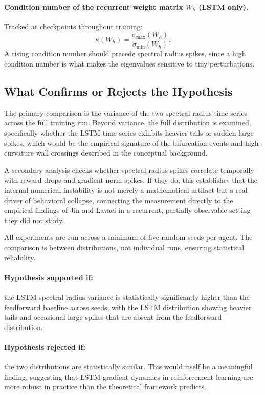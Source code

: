 \documentclass[11pt,a4paper]{article}
\begin{document}
\paragraph{Condition number of the recurrent weight matrix $W_h$ (LSTM only).}
Tracked at checkpoints throughout training:
\begin{equation}
  \kappa(W_h) = \frac{\sigma_{\max}(W_h)}{\sigma_{\min}(W_h)}.
\end{equation}
A rising condition number should precede spectral radius spikes, since a high condition number is what makes the eigenvalues sensitive to tiny perturbations.

\subsection{What Confirms or Rejects the Hypothesis}

The primary comparison is the variance of the two spectral radius time series across the full training run. Beyond variance, the full distribution is examined, specifically whether the LSTM time series exhibits heavier tails or sudden large spikes, which would be the empirical signature of the bifurcation events and high-curvature wall crossings described in the conceptual background.

A secondary analysis checks whether spectral radius spikes correlate temporally with reward drops and gradient norm spikes. If they do, this establishes that the internal numerical instability is not merely a mathematical artifact but a real driver of behavioral collapse, connecting the measurement directly to the empirical findings of Jin and Lavaei in a recurrent, partially observable setting they did not study.

All experiments are run across a minimum of five random seeds per agent. The comparison is between distributions, not individual runs, ensuring statistical reliability.

\paragraph{Hypothesis supported if:}
the LSTM spectral radius variance is statistically significantly higher than the feedforward baseline across seeds, with the LSTM distribution showing heavier tails and occasional large spikes that are absent from the feedforward distribution.

\paragraph{Hypothesis rejected if:}
the two distributions are statistically similar. This would itself be a meaningful finding, suggesting that LSTM gradient dynamics in reinforcement learning are more robust in practice than the theoretical framework predicts.
\end{document}
